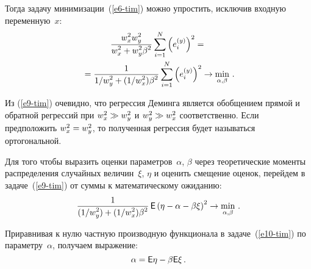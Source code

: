 \begin{multicols}{2}
  Тогда задачу минимизации~(\ref{e6-tim}) можно упростить, исключив
входную переменную~$x$:
  \begin{multline}
  \displaystyle\frac{\displaystyle w_x^2w_y^2\mathstrut}{\displaystyle w_x^2+w_y^2\beta^2\mathstrut}\sum\limits_{i=1}^N \left(
e_i^{(y)}\right)^2 ={}\\
{}= \displaystyle\frac{\displaystyle 1\mathstrut}{\displaystyle 1/w_y^2+(1/w_x^2)\beta^2\mathstrut} \sum\limits_{i=1}^N
\left( e_i^{(y)}\right)^2\to \min\limits_{\alpha,\beta}\,.
  \label{e9-tim}
  \end{multline}

  Из (\ref{e9-tim}) очевидно, что регрессия Деминга является обобщением
прямой и обратной регрессий при $w_x^2\hm\gg w_y^2$ и $w_y^2\hm\gg
w_x^2$ соответственно. Если предположить $w_x^2\hm=w_y^2$, то
полученная регрессия будет называться ортогональной.

  Для того чтобы выразить оценки параметров~$\alpha$, $\beta$ через
теоретические моменты распределения случайных величин~$\xi$, $\eta$ и
оценить смещение оценок, перейдем в задаче~(\ref{e9-tim}) от суммы к
математическому ожиданию:
  \begin{equation}
  \displaystyle\frac{\displaystyle 1\mathstrut}{\displaystyle (1/w_y^2)+(1/w_x^2)\beta^2\mathstrut}\,{\sf E}\left( \eta-\alpha-\beta\xi\right)^2\to
\min\limits_{\alpha,\beta}\,.
  \label{e10-tim}
  \end{equation}

  Приравнивая к нулю частную производную функционала в
  задаче~(\ref{e10-tim}) по параметру~$\alpha$, получаем выражение:
  $$
  \alpha={\sf E}\eta-\beta {\sf E} \xi\,.
  $$


\end{multicols}
